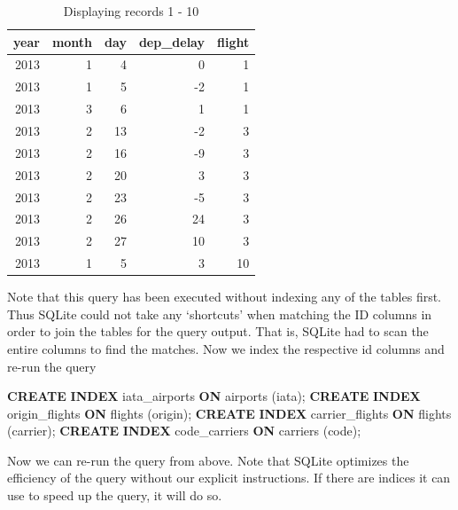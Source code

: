 \documentclass[
  12pt,
]{style/krantz}
\newenvironment{Shaded}{\begin{snugshade}}{\end{snugshade}}
\newcommand{\KeywordTok}[1]{\textcolor[rgb]{0.13,0.29,0.53}{\textbf{#1}}}
\newcommand{\NormalTok}[1]{#1}
\begin{document}
\begin{table}

\caption{\label{tab:unnamed-chunk-117}Displaying records 1 - 10}
\centering
\begin{tabular}[t]{r|r|r|r|r}
\hline
year & month & day & dep\_delay & flight\\
\hline
2013 & 1 & 4 & 0 & 1\\
\hline
2013 & 1 & 5 & -2 & 1\\
\hline
2013 & 3 & 6 & 1 & 1\\
\hline
2013 & 2 & 13 & -2 & 3\\
\hline
2013 & 2 & 16 & -9 & 3\\
\hline
2013 & 2 & 20 & 3 & 3\\
\hline
2013 & 2 & 23 & -5 & 3\\
\hline
2013 & 2 & 26 & 24 & 3\\
\hline
2013 & 2 & 27 & 10 & 3\\
\hline
2013 & 1 & 5 & 3 & 10\\
\hline
\end{tabular}
\end{table}

Note that this query has been executed without indexing any of the tables first. Thus SQLite could not take any `shortcuts' when matching the ID columns in order to join the tables for the query output. That is, SQLite had to scan the entire columns to find the matches. Now we index the respective id columns and re-run the query

\begin{Shaded}
\begin{Highlighting}[]
\KeywordTok{CREATE} \KeywordTok{INDEX}\NormalTok{ iata\_airports }\KeywordTok{ON}\NormalTok{ airports (iata);}
\KeywordTok{CREATE} \KeywordTok{INDEX}\NormalTok{ origin\_flights }\KeywordTok{ON}\NormalTok{ flights (origin);}
\KeywordTok{CREATE} \KeywordTok{INDEX}\NormalTok{ carrier\_flights }\KeywordTok{ON}\NormalTok{ flights (carrier);}
\KeywordTok{CREATE} \KeywordTok{INDEX}\NormalTok{ code\_carriers }\KeywordTok{ON}\NormalTok{ carriers (code);}
\end{Highlighting}
\end{Shaded}

Now we can re-run the query from above. Note that SQLite optimizes the efficiency of the query without our explicit instructions. If there are indices it can use to speed up the query, it will do so.
\end{document}
